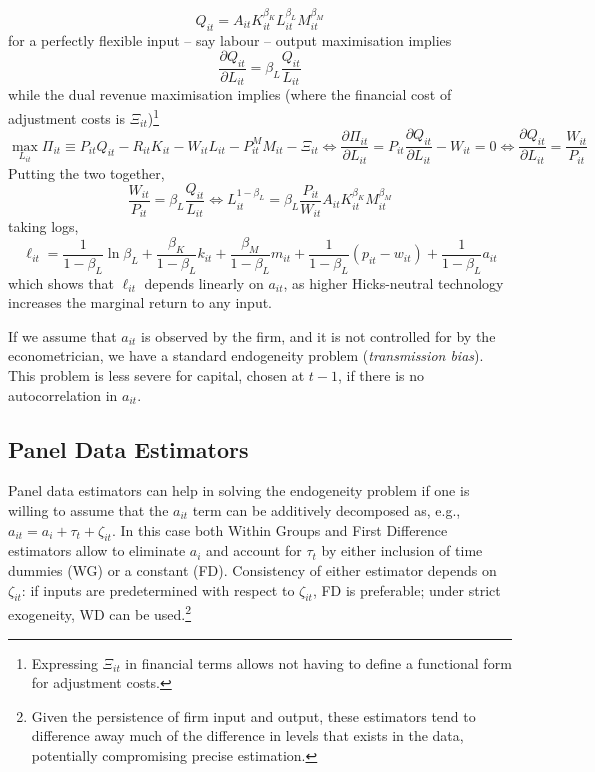 \documentclass[11pt]{article}
\begin{document}
\begin{equation*}
	\label{cd}
	Q_{it} = A_{it}K^{\beta_K}_{it}L^{\beta_L}_{it}M^{\beta_M}_{it}
\end{equation*}
for a perfectly flexible input -- say labour -- output maximisation implies
\begin{equation*}
	\frac{\partial Q_{it}}{\partial L_{it}} = \beta_L \frac{Q_{it}}{L_{it}}
\end{equation*}
while the dual revenue maximisation implies (where the financial cost of adjustment costs is $\Xi_{it}$)\footnote{Expressing $\Xi_{it}$ in financial terms allows not having to define a functional form for adjustment costs.}
\begin{equation*}
 \max_{L_{it}}	\Pi_{it} \equiv P_{it}Q_{it} - R_{it}K_{it} - W_{it}L_{it} - P^M_{it}M_{it} - \Xi_{it} \Leftrightarrow \frac{\partial \Pi_{it}}{\partial L_{it}} = P_{it}\frac{\partial Q_{it}}{\partial L_{it}} - W_{it} = 0 \Leftrightarrow \frac{\partial Q_{it}}{\partial L_{it}} = \frac{W_{it}}{P_{it}}
\end{equation*}
Putting the two together,
\begin{equation}
	\frac{W_{it}}{P_{it}} = \beta_L \frac{Q_{it}}{L_{it}} \Leftrightarrow L_{it}^{1-\beta_L} = \beta_L \frac{P_{it}}{W_{it}} A_{it}K^{\beta_K}_{it}M^{\beta_M}_{it}
\end{equation}
taking logs,
\begin{equation}
	\label{logs}
	\ell_{it} =  \frac{1}{1 - \beta_L}\ln \beta_L + \frac{\beta_K}{1 - \beta_L} k_{it} + \frac{\beta_M}{1 - \beta_L} m_{it} + \frac{1}{1 - \beta_L}(p_{it} - w_{it}) + \frac{1}{1 - \beta_L}a_{it}
\end{equation}
which shows that $\ell_{it}$ depends linearly on $a_{it}$, as higher Hicks-neutral technology increases the marginal return to any input.

If we assume that $a_{it}$ is observed by the firm, and it is not controlled for by the econometrician, we have a standard endogeneity problem (\textit{transmission bias}).
This problem is less severe for capital, chosen at $t-1$, if there is no autocorrelation in $a_{it}$. \\

\subsection{Panel Data Estimators}

Panel data estimators can help in solving the endogeneity problem if one is willing to assume that the $a_{it}$ term can be additively decomposed as, e.g., $a_{it} = a_i + \tau_t + \zeta_{it}$.
In this case both Within Groups and First Difference estimators allow to eliminate $a_i$ and account for $\tau_t$ by either inclusion of time dummies (WG) or a constant (FD).
Consistency of either estimator depends on $\zeta_{it}$: if inputs are predetermined with respect to $\zeta_{it}$, FD is preferable; under strict exogeneity, WD can be used.\footnote{Given the persistence of firm input and output, these estimators tend to difference away much of the difference in levels that exists in the data, potentially compromising precise estimation.}
\end{document}
